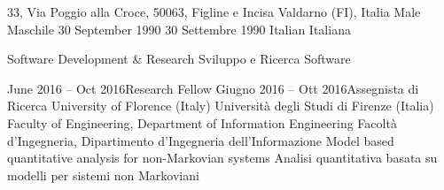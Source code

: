 
\newcommand{\cvLanguage}{english}

\newcommand{\enableCourses}{true}
\newcommand{\enableProjects}{true}
\newcommand{\enableSignature}{false}
\newcommand{\enableURLs}{true}
\newcommand{\enablePublications}{true}




  \begin{europasscv}
    
    \address
      {33, Via Poggio alla Croce, 50063, Figline e Incisa Valdarno (FI), Italy}
      {33, Via Poggio alla Croce, 50063, Figline e Incisa Valdarno (FI), Italia}
    \gender
      {Male}
      {Maschile}
    \dateOfBirth
      {30 September 1990}
      {30 Settembre 1990}
    \nationality
      {Italian}
      {Italiana}
    
    \personalInfo
    
    \jobAppliedFor
      {Software Development \& Research}
      {Sviluppo e Ricerca Software}
    
    \workExperience
      
      \job
      {June 2016 -- Oct 2016}{Research Fellow}
      {Giugno 2016 -- Ott 2016}{Assegnista di Ricerca}
        \jobLocation
          {University of Florence (Italy)}
          {Università degli Studi di Firenze (Italia)}
        \jobDepartment
          {Faculty of Engineering, Department of Information Engineering}
          {Facoltà d'Ingegneria, Dipartimento d'Ingegneria dell'Informazione}
        \jobDescription
          {Model based quantitative analysis for non-Markovian systems}
          {Analisi quantitativa basata su modelli per sistemi non Markoviani}
      

\end{europasscv}
